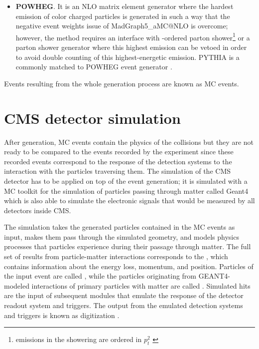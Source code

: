 \begin{itemize}
\item \textbf{POWHEG}. It is an NLO matrix element generator where the hardest emission of color charged particles is generated in such a way that the negative event weights issue of MadGraph5\_aMC@NLO is overcome; however, the method requires an interface with \pt-ordered parton shower\footnote{emissions in the showering are ordered in $p_t^2$ \cite{pt_order}} or a parton shower generator where this highest emission can be vetoed in order to avoid double counting of this highest-energetic emission. PYTHIA is a commonly matched to POWHEG event generator \cite{powheg}.
\end{itemize}

Events resulting from the whole generation process are known as MC events. 

\section{CMS detector simulation}

After generation, MC events contain the physics of the collisions but they are not ready to be compared to the events recorded by the experiment since these recorded events correspond to the response of the detection systems to the interaction with the particles traversing them. The simulation of the CMS detector has to be applied on top of the event generation; it is simulated with a MC toolkit for the simulation of particles passing through matter called Geant4 \cite{geant} which is also able to simulate the electronic signals that would be measured by all detectors inside CMS.

The simulation takes the generated particles contained in the MC events as input, makes them pass through the simulated geometry, and models physics processes that particles experience during their passage through matter. The full set of results from particle-matter interactions corresponds to the , which contains information about the energy loss, momentum, and position. Particles of the input event are called , while the particles originating from GEANT4-modeled interactions of primary particles with matter are called .  Simulated hits are the input of subsequent modules that emulate the response of the detector readout system and triggers. The output from the emulated detection systems and triggers is known as digitization \cite{geant,geant2}.

